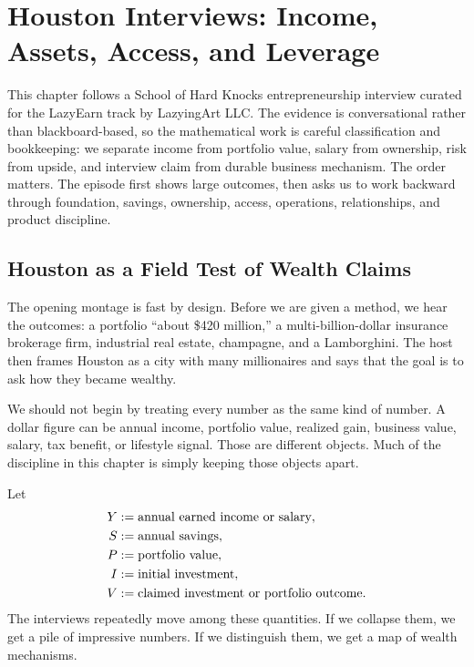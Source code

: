 \chapter{Houston Interviews: Income, Assets, Access, and Leverage}

This chapter follows a School of Hard Knocks entrepreneurship interview curated for the LazyEarn track by LazyingArt LLC. The evidence is conversational rather than blackboard-based, so the mathematical work is careful classification and bookkeeping: we separate income from portfolio value, salary from ownership, risk from upside, and interview claim from durable business mechanism. The order matters. The episode first shows large outcomes, then asks us to work backward through foundation, savings, ownership, access, operations, relationships, and product discipline.

\section{Houston as a Field Test of Wealth Claims}

The opening montage is fast by design. Before we are given a method, we hear the outcomes: a portfolio ``about \$420 million,'' a multi-billion-dollar insurance brokerage firm, industrial real estate, champagne, and a Lamborghini. The host then frames Houston as a city with many millionaires and says that the goal is to ask how they became wealthy.

We should not begin by treating every number as the same kind of number. A dollar figure can be annual income, portfolio value, realized gain, business value, salary, tax benefit, or lifestyle signal. Those are different objects. Much of the discipline in this chapter is simply keeping those objects apart.

Let
\begin{align}
Y &:= \hbox{annual earned income or salary},\\
S &:= \hbox{annual savings},\\
P &:= \hbox{portfolio value},\\
I &:= \hbox{initial investment},\\
V &:= \hbox{claimed investment or portfolio outcome}.
\end{align}
The interviews repeatedly move among these quantities. If we collapse them, we get a pile of impressive numbers. If we distinguish them, we get a map of wealth mechanisms.

